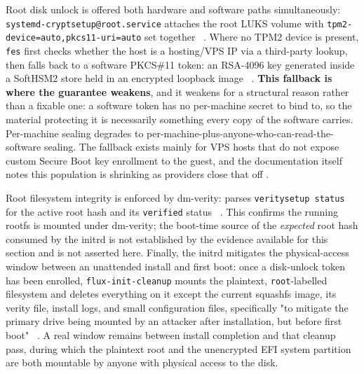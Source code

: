 Root disk unlock is offered both hardware and software paths simultaneously:
\texttt{systemd-cryptsetup@root.\allowbreak{}service} attaches the root LUKS volume with
\texttt{tpm2-\allowbreak{}device=\allowbreak{}auto,\allowbreak{}pkcs11-\allowbreak{}uri=\allowbreak{}auto} set together
\shipped~. Where no TPM2 device
is present, \texttt{fes} first checks whether the host is a hosting/VPS IP via a third-party
lookup, then falls back to a software PKCS\#11 token: an RSA-4096 key generated inside a SoftHSM2
store held in an encrypted loopback image \shipped~. \textbf{This fallback is where the guarantee
weakens}, and it weakens for a structural reason rather than a fixable one: a software token has no
per-machine secret to bind to, so the material protecting it is necessarily something every copy of
the software carries. Per-machine sealing degrades to
per-machine-plus-anyone-who-can-read-the-software sealing. The fallback exists mainly for VPS hosts
that do not expose custom Secure Boot key enrollment to the guest, and the \ArcaneOS documentation
itself notes this population is shrinking as providers close that off
.

Root filesystem integrity is enforced by dm-verity: \fluxsas parses \texttt{veritysetup status}
for the active root hash and its \texttt{verified} status
\shipped~. This confirms the running rootfs is mounted
under dm-verity; the boot-time source of the \emph{expected} root hash consumed by the initrd is
not established by the evidence available for this section and is not asserted here. Finally, the
initrd mitigates the physical-access window between an unattended install and first boot: once a
disk-unlock token has been enrolled, \texttt{flux-\allowbreak{}init-\allowbreak{}cleanup} mounts the plaintext,
\texttt{root}-labelled filesystem and deletes everything on it except the current squashfs image,
its verity file, install logs, and small configuration files, specifically "to mitigate the
primary drive being mounted by an attacker after installation, but before first boot"
\shipped~. A real window remains
between install completion and that cleanup pass, during which the plaintext root and the
unencrypted EFI system partition are both mountable by anyone with physical access to the disk.

